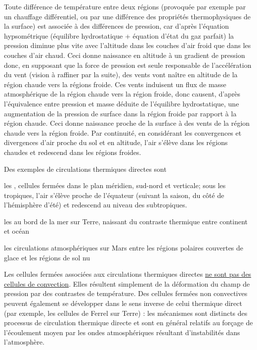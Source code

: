 \sk
Toute différence de température entre deux régions (provoquée par exemple par un chauffage différentiel, ou par une différence des propriétés thermophysiques de la surface) est associée à des différences de pression, car d'après l'équation hypsométrique (équilibre hydrostatique + équation d'état du gaz parfait) la pression diminue plus vite avec l'altitude dans les couches d'air froid que dans les couches d'air chaud. Ceci donne naissance en altitude à un gradient de pression donc, en supposant que la force de pression est seule responsable de l'accélération du vent (vision à raffiner par la suite), des vents vont naître en altitude de la région chaude vers la régions froide. Ces vents induisent un flux de masse atmosphérique de la région chaude vers la région froide, donc causent, d'après l'équivalence entre pression et masse déduite de l'équilibre hydrostatique, une augmentation de la pression de surface dans la région froide par rapport à la région chaude. Ceci donne naissance proche de la surface à des vents de la région chaude vers la région froide. Par continuité, en considérant les convergences et divergences d'air proche du sol et en altitude, l'air s'élève dans les régions chaudes et redescend dans les régions froides.

\sk
Des exemples de circulations thermiques directes sont
\begin{finger}
\item les , cellules fermées dans le plan méridien, sud-nord et verticale; sous les tropiques, l'air s'élève proche de l'équateur (suivant la saison, du côté de l'hémisphère d'été) et redescend au niveau des subtropiques.
\item les  au bord de la mer sur Terre, naissant du contraste thermique entre continent et océan
\item les circulations atmosphériques sur Mars entre les régions polaires couvertes de glace et les régions de sol nu
\end{finger}

\sk
Les cellules fermées associées aux circulations thermiques directes \underline{ne sont pas des cellules de convection}. Elles résultent simplement de la déformation du champ de pression par des contrastes de température. Des cellules fermées non convectives peuvent également se développer dans le sens inverse de celui thermique direct (par exemple, les cellules de Ferrel sur Terre) : les mécanismes sont distincts des processus de circulation thermique directe et sont en général relatifs au forçage de l'écoulement moyen par les ondes atmosphériques résultant d'instabilités dans l'atmosphère.



